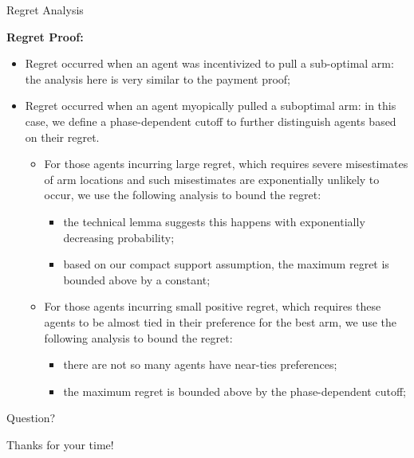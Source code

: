 \documentclass[serif]{beamer}
\begin{document}
\begin{frame}{Regret Analysis}

\footnotesize{
\textbf{Regret Proof:}
\begin{itemize}[label=\textbullet]
\item<1-> Regret occurred when an agent was incentivized to pull a sub-optimal arm: the analysis here is very similar to the payment proof;
\item<2-> Regret occurred when an agent myopically pulled a suboptimal arm: in this case, we define a phase-dependent cutoff to further distinguish agents based on their regret.
\begin{itemize}[label=\textbullet]
\item<3-> For those agents incurring large regret, which requires severe misestimates of arm locations and such misestimates are exponentially unlikely to occur, we use the following analysis to bound the regret:
\begin{itemize}[label=$\star$]
\item the technical lemma suggests this happens with exponentially decreasing probability;
\item based on our compact support assumption, the maximum regret is bounded above by a constant;
\end{itemize}
\item<4-> For those agents incurring small positive regret, which requires these agents to be almost tied in their preference for the best arm, we use the following analysis to bound the regret: 
\begin{itemize}[label=$\star$] 
\item there are not so many agents have near-ties preferences; 
\item the maximum regret is bounded above by the phase-dependent cutoff;
\end{itemize}
\end{itemize}
\end{itemize}
}

\end{frame}
\begin{frame}{Question?}
\begin{center}
\Huge{Thanks for your time!}
\end{center}
\end{frame}
\end{document}
